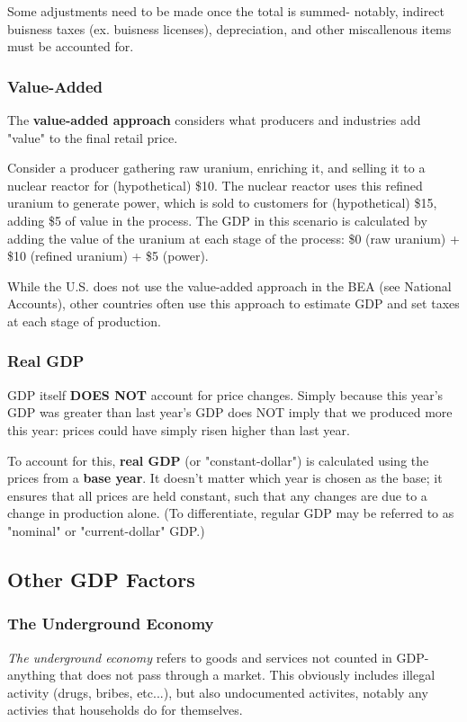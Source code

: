 \documentclass[12pt, a4paper]{article}
\theoremstyle{definition}
\begin{document}
Some adjustments need to be made once the total is summed- notably, indirect buisness taxes (ex. buisness licenses), depreciation, and other miscallenous items must be accounted for.

\subsubsection{Value-Added}

The \textbf{value-added approach} considers what producers and industries add "value" to the final retail price.

Consider a producer gathering raw uranium, enriching it, and selling it to a nuclear reactor for (hypothetical) \$10.
The nuclear reactor uses this refined uranium to generate power, which is sold to customers for (hypothetical) \$15, adding \$5 of value in the process.
The GDP in this scenario is calculated by adding the value of the uranium at each stage of the process: \$0 (raw uranium) + \$10 (refined uranium) + \$5 (power).

While the U.S. does not use the value-added approach in the BEA (see National Accounts), other countries often use this approach to estimate GDP and set taxes at each stage of production.

\subsubsection{Real GDP}

GDP itself \textbf{DOES NOT} account for price changes.
Simply because this year's GDP was greater than last year's GDP does NOT imply that we produced more this year: prices could have simply risen higher than last year.

To account for this, \textbf{real GDP} (or "constant-dollar") is calculated using the prices from a \textbf{base year}.
It doesn't matter which year is chosen as the base; it ensures that all prices are held constant, such that any changes are due to a change in production alone.
(To differentiate, regular GDP may be referred to as "nominal" or "current-dollar" GDP.)

\subsection{Other GDP Factors}

\subsubsection{The Underground Economy}
\textit{The underground economy} refers to goods and services not counted in GDP- anything that does not pass through a market.
This obviously includes illegal activity (drugs, bribes, etc...), but also undocumented activites, notably any activies that households do for themselves.
\end{document}
